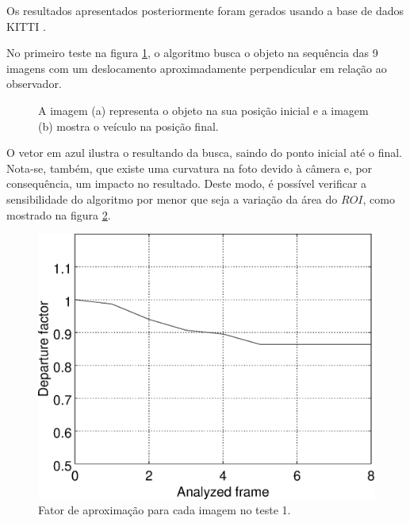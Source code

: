 
Os resultados apresentados posteriormente foram gerados usando a base de dados KITTI \cite{Geiger}.

No primeiro teste na figura \ref{fig:imgpapercerta}, o algoritmo busca o objeto na sequência das
9 imagens com um deslocamento aproximadamente perpendicular em relação ao observador.

\begin{figure}[!hbt]
\centering
  \caption{A imagem (a) representa o objeto na sua posição inicial 
   e a imagem (b) mostra o veículo na posição final.}
  \label{fig:imgpapercerta}
\end{figure}

O vetor em azul ilustra o resultando da busca, saindo do ponto inicial até o final. 
Nota-se, também, que existe uma curvatura na foto devido à câmera e, por consequência,
um impacto no resultado. Deste modo, é possível verificar a sensibilidade do algoritmo 
por menor que seja a variação da área do $ROI$, como mostrado na figura \ref{fig:res_graph1}.

\begin{figure}[!hbt]
\centering
\includegraphics[width=0.8\columnwidth]{images/graph1.eps}
\caption{Fator de aproximação para cada imagem no teste 1.}
\label{fig:res_graph1}
\end{figure}

